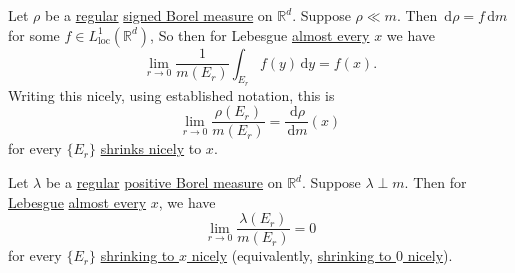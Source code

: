 \begin{corollary}
	Let \(\rho\) be a \hyperref[def:regular]{regular} \hyperref[def:signed-measure]{signed Borel measure} on \(\mathbb{R}^d\). Suppose \(\rho \ll m\). Then
	\(\,\mathrm{d}\rho = f\,\mathrm{d}m\) for some \(f \in L^1_{\mathrm{loc}}(\mathbb{R}^d)\), So then for Lebesgue \hyperref[def:mu-almost-everywhere]{almost every} \(x\)
	we have
	\[
		\lim_{r \to 0} \frac{1}{m(E_r)} \int_{E_r} f(y) \,\mathrm{d}y = f(x).
	\]
	Writing this nicely, using established notation, this is
	\[
		\lim_{r \to 0} \frac{\rho(E_r)}{m(E_r)} = \frac{\,\mathrm{d}\rho}{\,\mathrm{d}m}(x)
	\]
	for every \(\{E_r\}\) \hyperref[def:shrink-nicely]{shrinks nicely} to \(x\).
\end{corollary}

\begin{proposition}\label{prop:lec-32}
	Let \(\lambda\) be a \hyperref[def:regular]{regular} \hyperref[def:signed-measure]{positive Borel measure} on \(\mathbb{R}^d\). Suppose \(\lambda \perp m\).
	Then for \hyperref[def:Lebesgue-measure]{Lebesgue} \hyperref[def:mu-almost-everywhere]{almost every} \(x\), we have
	\[
		\lim_{r \to 0} \frac{\lambda(E_r)}{m(E_r)} = 0
	\]
	for every \(\{E_r\}\) \hyperref[def:shrink-nicely]{shrinking to \(x\) nicely} (equivalently, \hyperref[def:shrink-nicely]{shrinking to \(0\) nicely}).
\end{proposition}

